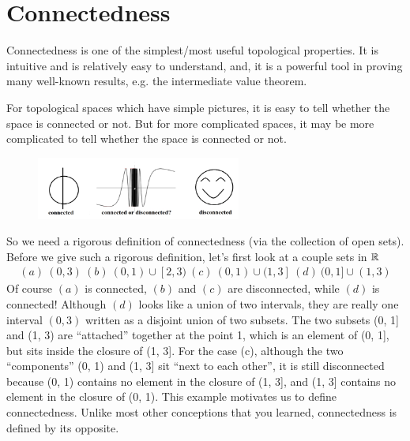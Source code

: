 \chapter{Connectedness}\label{chp:2_4}


Connectedness is one of the simplest/most useful topological properties. It is intuitive and is relatively easy to understand, and, it is a powerful tool in proving many
well-known results, e.g. the intermediate value theorem.

For topological spaces which have simple pictures, it is easy to tell whether the space
is connected or not. But for more complicated spaces, it may be more complicated to
tell whether the space is connected or not.

\begin{figure}[htbp]
    \centering
    \includegraphics[width=0.6\textwidth]{figure/connectedness.png}
    \caption{}
\end{figure}

So we need a rigorous definition of connectedness (via the collection of open sets).
Before we give such a rigorous definition, let’s first look at a couple sets in $\mathbb{R}$
\begin{align*}
    (a)\  (0,3)\ (b)\ (0,1)\cup [2,3)\ (c)\ (0,1)\cup (1,3]\ (d)\ (0,1]\cup (1,3)
\end{align*}
Of course $(a)$ is connected, 
$(b)$ and $(c)$ are disconnected, 
while $(d)$ is connected! 
Although $(d)$ looks like a union of two intervals, they are really one interval $(0, 3)$ written
as a disjoint union of two subsets. The two subsets (0, 1] and (1, 3) are “attached”
together at the point 1, which is an element of (0, 1], but sits inside the closure of
(1, 3]. For the case (c), although the two “components” (0, 1) and (1, 3] sit “next to
each other”, it is still disconnected because (0, 1) contains no element in the closure of
(1, 3], and (1, 3] contains no element in the closure of (0, 1).
This example motivates us to define connectedness. Unlike most other conceptions
that you learned, connectedness is defined by its opposite. 

